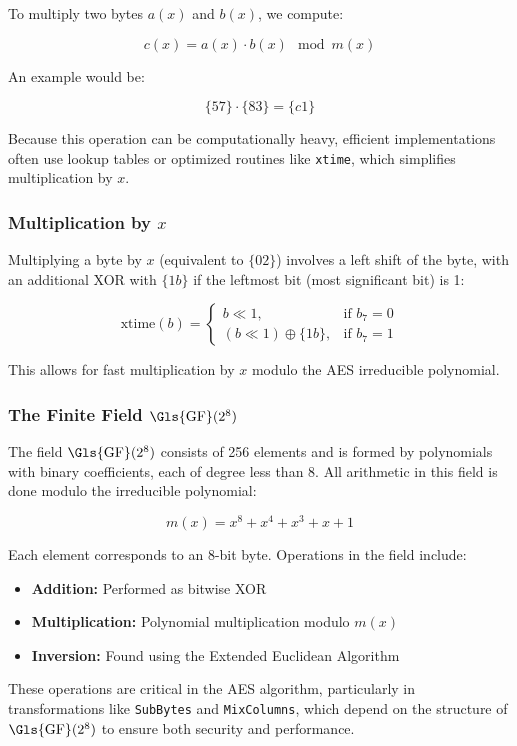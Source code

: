 To multiply two bytes $a(x)$ and $b(x)$, we compute:

\[
c(x) = a(x) \cdot b(x) \mod m(x)
\]

An example would be:

\[
\{57\} \cdot \{83\} = \{c1\}
\]

Because this operation can be computationally heavy, efficient implementations often use lookup tables or optimized routines like \texttt{xtime}, which simplifies multiplication by $x$.

\subsubsection{Multiplication by \texorpdfstring{$x$}{x}}
\label{sec:multx}

Multiplying a byte by $x$ (equivalent to $\{02\}$) involves a left shift of the byte, with an additional XOR with $\{1b\}$ if the leftmost bit (most significant bit) is 1:

\[
\text{xtime}(b) =
\begin{cases}
b \ll 1, & \text{if } b_7 = 0 \\
(b \ll 1) \oplus \{1b\}, & \text{if } b_7 = 1
\end{cases}
\]

This allows for fast multiplication by $x$ modulo the \Gls{AES} irreducible polynomial.

\subsubsection{The Finite Field \texorpdfstring{$\mathrm{\Gls{GF}}(2^8)$}{\Gls{GF}(2^8)}}
\label{sec:galois}

The field $\mathrm{\Gls{GF}}(2^8)$ consists of 256 elements and is formed by polynomials with binary coefficients, each of degree less than 8. All arithmetic in this field is done modulo the irreducible polynomial:

\[
m(x) = x^8 + x^4 + x^3 + x + 1
\]

Each element corresponds to an 8-bit byte. Operations in the field include:
\begin{itemize}
    \item \textbf{Addition:} Performed as bitwise XOR
    \item \textbf{Multiplication:} Polynomial multiplication modulo $m(x)$
    \item \textbf{Inversion:} Found using the Extended Euclidean Algorithm
\end{itemize}

These operations are critical in the \Gls{AES} algorithm, particularly in transformations like \texttt{SubBytes} and \texttt{MixColumns}, which depend on the structure of $\mathrm{\Gls{GF}}(2^8)$ to ensure both security and performance.